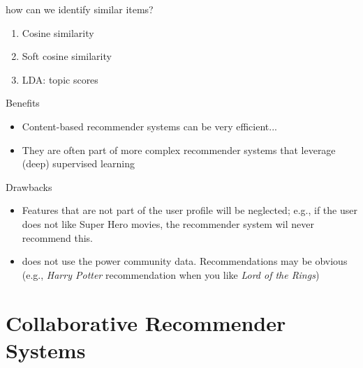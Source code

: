 \documentclass[handout]{beamer}
\begin{document}
\begin{frame}  
	\begin{block}{how can we identify similar items?}
		\begin{enumerate}
			\item<1->Cosine similarity
			\item<2->Soft cosine similarity
			\item<3-> LDA: topic scores
		\end{enumerate}
	\end{block}
\end{frame}

\begin{frame}
	\begin{exampleblock}{Benefits}
		\begin{itemize}
			\item <1-> Content-based recommender systems can be very efficient...
			\item <2->They are often part of more complex recommender systems that leverage (deep) supervised learning
		\end{itemize}
	\end{exampleblock}
	\begin{alertblock}{Drawbacks}
		\begin{itemize}
			\item <3->Features that are not part of the user profile will be neglected; e.g., if the user does not like Super Hero movies, the recommender system wil never recommend this. 
			\item <4->does not use the power community data. Recommendations may be obvious (e.g., \textit{Harry Potter} recommendation when you like \textit{Lord of the Rings})
		\end{itemize}
	\end{alertblock}
\end{frame}

\section[Collaborative RecSys]{Collaborative Recommender Systems}
\end{document}
